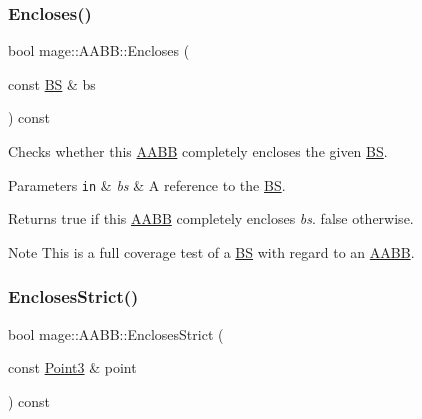 \subsubsection{\texorpdfstring{Encloses()}{Encloses()}\hspace{0.1cm}{\footnotesize\ttfamily [4/4]}}
{\footnotesize\ttfamily bool mage\+::\+A\+A\+B\+B\+::\+Encloses (\begin{DoxyParamCaption}\item[{const \hyperlink{classmage_1_1_b_s}{BS} \&}]{bs }\end{DoxyParamCaption}) const\hspace{0.3cm}{\ttfamily [noexcept]}}

Checks whether this \hyperlink{classmage_1_1_a_a_b_b}{A\+A\+BB} completely encloses the given \hyperlink{classmage_1_1_b_s}{BS}.


\begin{DoxyParams}[1]{Parameters}
\mbox{\tt in}  & {\em bs} & A reference to the \hyperlink{classmage_1_1_b_s}{BS}. \\
\hline
\end{DoxyParams}
\begin{DoxyReturn}{Returns}
{\ttfamily true} if this \hyperlink{classmage_1_1_a_a_b_b}{A\+A\+BB} completely encloses {\itshape bs}. {\ttfamily false} otherwise. 
\end{DoxyReturn}
\begin{DoxyNote}{Note}
This is a full coverage test of a \hyperlink{classmage_1_1_b_s}{BS} with regard to an \hyperlink{classmage_1_1_a_a_b_b}{A\+A\+BB}. 
\end{DoxyNote}
\hypertarget{classmage_1_1_a_a_b_b_a0399860c66da2dfc593b6ad5702c7525}{}\label{classmage_1_1_a_a_b_b_a0399860c66da2dfc593b6ad5702c7525} 
\subsubsection{\texorpdfstring{Encloses\+Strict()}{EnclosesStrict()}\hspace{0.1cm}{\footnotesize\ttfamily [1/4]}}
{\footnotesize\ttfamily bool mage\+::\+A\+A\+B\+B\+::\+Encloses\+Strict (\begin{DoxyParamCaption}\item[{const \hyperlink{structmage_1_1_point3}{Point3} \&}]{point }\end{DoxyParamCaption}) const\hspace{0.3cm}{\ttfamily [noexcept]}}

